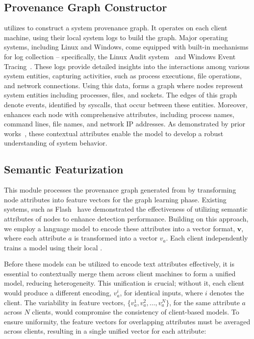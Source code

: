 \subsection{Provenance Graph Constructor} 
\label{provconstruct}

\Sys utilizes \logs to construct a system provenance graph. It operates on each client machine, using their local system logs to build the graph. Major operating systems, including Linux and Windows, come equipped with built-in mechanisms for log collection -- specifically, the Linux Audit system~\cite{linuxaudit} and Windows Event Tracing~\cite{windowsaudit}. These logs provide detailed insights into the interactions among various system entities, capturing activities, such as process executions, file operations, and network connections. Using this data, \Sys forms a graph where nodes represent system entities including processes, files, and sockets. The edges of this graph denote events, identified by syscalls, that occur between these entities. Moreover, \Sys enhances each node with comprehensive attributes, including process names, command lines, file names, and network IP addresses. As demonstrated by prior works~\cite{flash2024,cheng2023kairos}, these contextual attributes enable the model to develop a robust understanding of system behavior.

\subsection{Semantic Featurization}
\label{semanfeat}

This module processes the provenance graph generated from \logs by transforming node attributes into feature vectors for the graph learning phase. Existing systems, such as Flash~\cite{flash2024} have demonstrated the effectiveness of utilizing semantic attributes of nodes to enhance detection performance. Building on this approach, we employ a \wordvec language model to encode these attributes into a vector format, \(\mathbf{v}\), where each attribute \(a\) is transformed into a vector \(v_a\). Each client independently trains a \wordvec model using their local \logs.

Before these models can be utilized to encode text attributes effectively, it is essential to contextually merge them across client machines to form a unified model, reducing heterogeneity. This unification is crucial; without it, each client would produce a different encoding, \(v_a^i\), for identical inputs, where \(i\) denotes the client. The variability in feature vectors, \(\{v_a^1, v_a^2, \ldots, v_a^N\}\), for the same attribute \(a\) across \(N\) clients, would compromise the consistency of client-based \gnnshort models. To ensure uniformity, the feature vectors for overlapping attributes must be averaged across clients, resulting in a single unified vector for each attribute:

